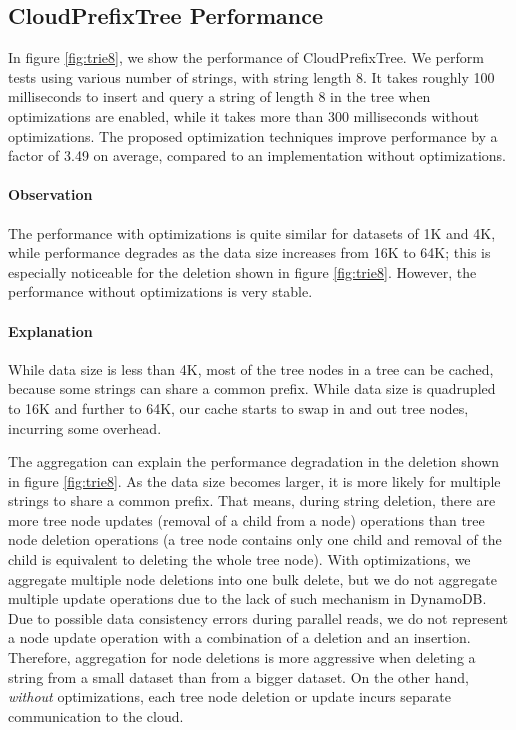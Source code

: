 \documentclass[10pt, conference, compsocconf]{IEEEtran}
\begin{document}
\subsection{CloudPrefixTree Performance}
In figure \ref{fig:trie8}, we show the performance of CloudPrefixTree.
We perform tests using various number of strings, with string length 8.
It takes roughly 100 milliseconds to insert and query a string of length 8 in the tree 
when optimizations are enabled, while it takes more than 300 milliseconds without optimizations. 
The proposed optimization techniques improve performance by a factor of 3.49 on average,
compared to an implementation without optimizations.

\paragraph{Observation}
The performance with optimizations is quite similar for datasets of 1K and 4K,
while performance degrades as the data size increases from 16K to 64K;
this is especially noticeable for the deletion shown in figure \ref{fig:trie8}.
However, the performance without optimizations is very stable.

\paragraph{Explanation}
While data size is less than 4K, most of the tree nodes in a tree can be cached, because
some strings can share a common prefix. While data size is quadrupled to 16K and further to 64K,
our cache starts to swap in and out tree nodes, incurring some overhead.

The aggregation can explain the performance degradation in the deletion shown in  
figure \ref{fig:trie8}. As the data size becomes larger, it is more likely for multiple strings to
share a common prefix. That means, during string deletion, there are more tree node updates (removal of a child from a node)
 operations than tree node deletion operations 
 (a tree node contains only one child and removal of the child is equivalent to deleting the whole tree node). 
 With optimizations, we aggregate multiple node deletions into one bulk delete, but we do not aggregate multiple update operations due to the 
 lack of such mechanism in DynamoDB. 
 Due to possible data consistency errors during parallel reads, we do not represent a node update operation with a combination of
 a deletion and an insertion.
 Therefore, aggregation for node deletions is more aggressive when deleting a string from a small dataset than from a bigger dataset.
 On the other hand, \emph{without} optimizations, each tree node deletion or update incurs separate communication to the cloud.
 
\end{document}
